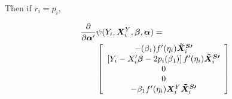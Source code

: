 \documentclass[]{article}
\begin{document}
Then if $r_i=p_i$,

\begin{align*}
  \frac{\partial}{\partial \bm{\alpha}'}&\psi(Y_i,\bm{X}^Y_i,\bm{\beta},\bm{\alpha})=\\
  & \left[\begin{array}{c}
          -(\beta_1)f'(\eta_i)\bm{\tilde{X}^{S\prime}}_i\\
          \left[Y_i-X_i'\bm{\beta}-2p_i(\beta_1)\right]f'(\eta_i)\bm{\tilde{X}^{S\prime}}_i\\
          0\\
          0\\
          -\beta_1f'(\eta_i)\bm{X}^Y_i\bm{\tilde{X}^{S\prime}}_i
    \end{array}\right]
\end{align*}
\end{document}
